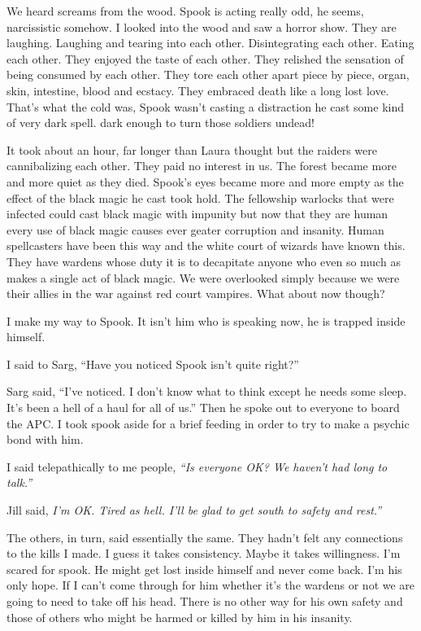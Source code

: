 We heard screams from the wood. Spook is acting really odd, he seems, narcissistic somehow. I looked into the wood and saw a horror show. They are laughing. Laughing and tearing into each other. Disintegrating each other. Eating each other. They enjoyed the taste of each other. They relished the sensation of being consumed by each other. They tore each other apart piece by piece, organ, skin, intestine, blood and ecstacy. They embraced death like a long lost love. That's what the cold was, Spook wasn't casting a distraction he cast some kind of very dark spell. dark enough to turn those soldiers undead!

It took about an hour, far longer than Laura thought but the raiders were cannibalizing each other. They paid no interest in us. The forest became more and more quiet as they died. Spook's eyes became more and more empty as the effect of the black magic he cast took hold. The fellowship warlocks that were infected could cast black magic with impunity but now that they are human every use of black magic causes ever geater corruption and insanity. Human spellcasters have been this way and the white court of wizards have known this. They have wardens whose duty it is to decapitate anyone who even so much as makes a single act of black magic. We  were overlooked simply because we were their allies in the war against red court vampires.  What about now though?

I make my way to Spook. It isn't him who is speaking now, he is trapped inside himself.

I said to Sarg, ``Have you noticed Spook isn't quite right?''

Sarg said, ``I've noticed. I don't know what to think except he needs some sleep. It's been a hell of a haul for all of us.'' Then he spoke out to everyone to board the APC. I took spook aside for a brief feeding in order to try to make a psychic bond with him.

I said telepathically to me people, \textit{``Is everyone OK? We haven't had long to talk.''}

Jill said, \textit{I'm OK. Tired as hell. I'll be glad to get south to safety and rest.''}

The others, in turn, said essentially the same. They hadn't felt any connections to the kills I made. I guess it takes consistency. Maybe it takes willingness. I'm scared for spook. He might get lost inside himself and never come back. I'm his only hope. If I can't come through for him whether it's the wardens or not we are going to need to take off his head. There is no other way for his own safety and those of others who might be harmed or killed by him in his insanity.

